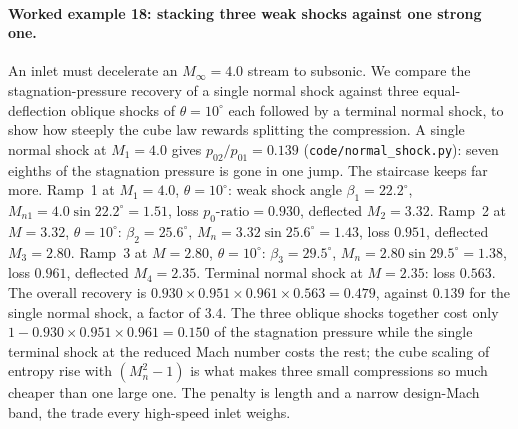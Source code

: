 \paragraph{Worked example 18: stacking three weak shocks against one
strong one.} An inlet must decelerate an $M_\infty = 4.0$ stream to
subsonic. We compare the stagnation-pressure recovery of a single
normal shock against three equal-deflection oblique shocks of
$\theta = 10^{\circ}$ each followed by a terminal normal shock, to show
how steeply the cube law rewards splitting the compression. A single
normal shock at $M_1 = 4.0$ gives $p_{02}/p_{01} = 0.139$
(\texttt{code/normal\_shock.py}): seven eighths of the stagnation
pressure is gone in one jump. The staircase keeps far more. Ramp~1 at
$M_1 = 4.0$, $\theta = 10^{\circ}$: weak shock angle $\beta_1 =
22.2^{\circ}$, $M_{n1} = 4.0\sin 22.2^{\circ} = 1.51$, loss
$p_0\text{-ratio} = 0.930$, deflected $M_2 = 3.32$. Ramp~2 at
$M = 3.32$, $\theta = 10^{\circ}$: $\beta_2 = 25.6^{\circ}$, $M_{n} =
3.32\sin 25.6^{\circ} = 1.43$, loss $0.951$, deflected $M_3 = 2.80$.
Ramp~3 at $M = 2.80$, $\theta = 10^{\circ}$: $\beta_3 = 29.5^{\circ}$,
$M_{n} = 2.80\sin 29.5^{\circ} = 1.38$, loss $0.961$, deflected
$M_4 = 2.35$. Terminal normal shock at $M = 2.35$: loss $0.563$. The
overall recovery is $0.930\times 0.951\times 0.961\times 0.563 =
0.479$, against $0.139$ for the single normal shock, a factor of $3.4$.
The three oblique shocks together cost only $1 - 0.930\times 0.951
\times 0.961 = 0.150$ of the stagnation pressure while the single
terminal shock at the reduced Mach number costs the rest; the cube
scaling of entropy rise with $(M_n^2 - 1)$ is what makes three small
compressions so much cheaper than one large one. The penalty is
length and a narrow design-Mach band, the trade every high-speed inlet
weighs.

